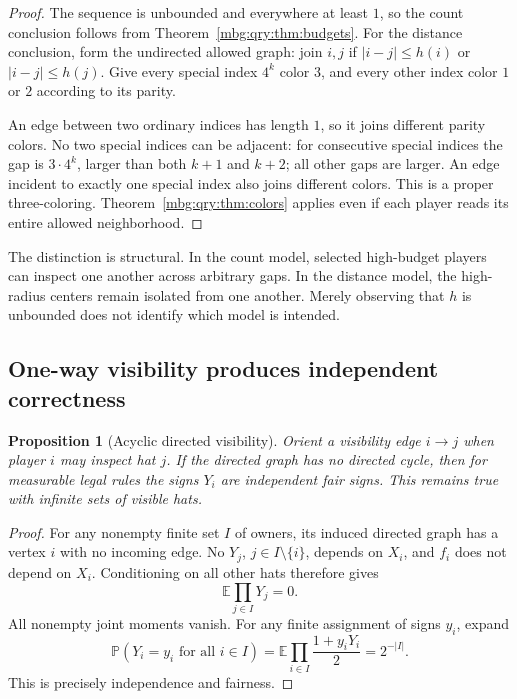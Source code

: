 \documentclass[11pt,letterpaper]{article}
\newtheorem{proposition}[theorem]{Proposition}
\theoremstyle{definition}
\newcommand{\E}{\mathbb E}
\newcommand{\Prb}{\mathbb P}
\begin{document}
\begin{proof}
The sequence is unbounded and everywhere at least \(1\), so the
count conclusion follows from Theorem~\ref{mbg:qry:thm:budgets}.
For the distance conclusion, form the undirected allowed graph:
join \(i,j\) if \(|i-j|\le h(i)\) or \(|i-j|\le h(j)\).
Give every special index \(4^k\) color \(3\), and every other index
color \(1\) or \(2\) according to its parity.

An edge between two ordinary indices has length \(1\), so it joins
different parity colors. No two special indices can be adjacent:
for consecutive special indices the gap is \(3\cdot4^k\), larger
than both \(k+1\) and \(k+2\); all other gaps are larger.
An edge incident to exactly one special index also joins different
colors. This is a proper three-coloring.
Theorem~\ref{mbg:qry:thm:colors} applies even if each player reads its entire
allowed neighborhood.
\end{proof}

The distinction is structural. In the count model, selected high-budget
players can inspect one another across arbitrary gaps. In the distance
model, the high-radius centers remain isolated from one another.
Merely observing that \(h\) is unbounded does not identify which model
is intended.

\subsection{One-way visibility produces independent correctness}

\begin{proposition}[Acyclic directed visibility]
\label{mbg:qry:prop:acyclic}
Orient a visibility edge \(i\to j\) when player \(i\) may inspect hat \(j\).
If the directed graph has no directed cycle, then for measurable legal
rules the signs \(Y_i\) are independent fair signs. This remains true
with infinite sets of visible hats.
\end{proposition}

\begin{proof}
For any nonempty finite set \(I\) of owners, its induced directed graph
has a vertex \(i\) with no incoming edge. No \(Y_j\), \(j\in I\setminus
\{i\}\), depends on \(X_i\), and \(f_i\) does not depend on \(X_i\).
Conditioning on all other hats therefore gives
\[
 \E\prod_{j\in I}Y_j=0.
\]
All nonempty joint moments vanish. For any finite assignment of signs
\(y_i\), expand
\[
 \Prb(Y_i=y_i\text{ for all }i\in I)
 =\E\prod_{i\in I}\frac{1+y_iY_i}{2}=2^{-|I|}.
\]
This is precisely independence and fairness.
\end{proof}
\end{document}
